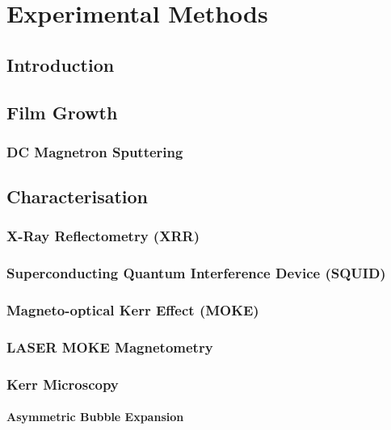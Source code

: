 \chapter{Experimental Methods}\label{ch:Methods}
\section{Introduction}\label{sec:MethodsIntro}

\section{Film Growth}\label{sec:FilmGrowth}
\subsection{DC Magnetron Sputtering}\label{subsec:Sputtering}

\section{Characterisation}\label{sec:Characterisation}
\subsection{X-Ray Reflectometry (XRR)}\label{subsec:XRR}

\subsection{Superconducting Quantum Interference Device (SQUID)}\label{subsec:SQUID}

\subsection{Magneto-optical Kerr Effect (MOKE)}\label{subsec:MOKE}

\subsection{LASER MOKE Magnetometry}\label{subsec:LASERMOKE}

\subsection{Kerr Microscopy}\label{subsec:KerrMicroscopy}
\subsubsection*{Asymmetric Bubble Expansion}\label{subsubsec:BubbleExp}

